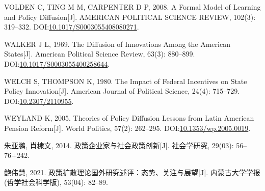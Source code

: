 \documentclass[
  12pt,
]{ctexart}
\newlength{\cslhangindent}
\newlength{\cslentryspacingunit} %
\newenvironment{CSLReferences}[2] %
 {%
  \setlength{\parindent}{0pt}
  \ifodd #1
  \let\oldpar\par
  \def\par{\hangindent=\cslhangindent\oldpar}
  \fi
  \setlength{\parskip}{#2\cslentryspacingunit}
 }%
 {}
\begin{document}
\begin{CSLReferences}{1}{0}
\leavevmode{}%
VOLDEN C, TING M M, CARPENTER D P, 2008. A Formal Model of Learning and Policy Diffusion{[}J{]}. AMERICAN POLITICAL SCIENCE REVIEW, 102(3): 319--332. DOI:\href{https://doi.org/10.1017/S0003055408080271}{10.1017/S0003055408080271}.

\leavevmode{}%
WALKER J L, 1969. The {Diffusion} of {Innovations} Among the {American States}{[}J{]}. American Political Science Review, 63(3): 880--899. DOI:\href{https://doi.org/10.1017/S0003055400258644}{10.1017/S0003055400258644}.

\leavevmode{}%
WELCH S, THOMPSON K, 1980. The {Impact} of {Federal Incentives} on {State Policy Innovation}{[}J{]}. American Journal of Political Science, 24(4): 715--729. DOI:\href{https://doi.org/10.2307/2110955}{10.2307/2110955}.

\leavevmode{}%
WEYLAND K, 2005. Theories of {Policy Diffusion Lessons} from {Latin American Pension Reform}{[}J{]}. World Politics, 57(2): 262--295. DOI:\href{https://doi.org/10.1353/wp.2005.0019}{10.1353/wp.2005.0019}.

\leavevmode{}%
朱亚鹏, 肖棣文, 2014. {政策企业家与社会政策创新}{[}J{]}. 社会学研究, 29(03): 56--76+242.

\leavevmode{}%
鲍伟慧, 2021. {政策扩散理论国外研究述评：态势、关注与展望}{[}J{]}. 内蒙古大学学报(哲学社会科学版), 53(04): 82--89.

\end{CSLReferences}
\end{document}
